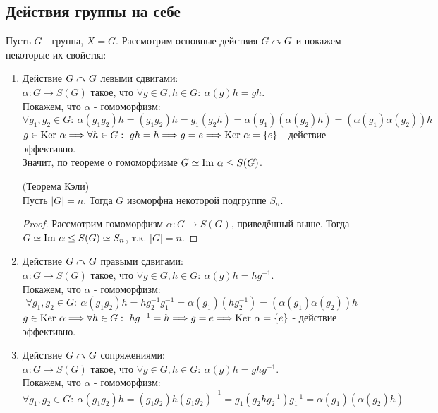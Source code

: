 \subsection{Действия группы на себе}
Пусть $G$ - группа, $X = G$. Рассмотрим основные действия $G \curvearrowright G$ и покажем некоторые их свойства:
\begin{enumerate}
    \item Действие $G \curvearrowright G$ левыми сдвигами:\\
    $\alpha: G \rightarrow S(G)$ такое, что $\forall g \in G, h \in G: \ \alpha(g)h = gh$.\\
    Покажем, что $\alpha$ - гомоморфизм:
    \[\forall g_1, g_2 \in G: \ \alpha(g_1g_2)h = (g_1g_2)h = g_1(g_2h) = \alpha(g_1)(\alpha(g_2)h) = (\alpha(g_1)\alpha(g_2))h\]
    $g \in \textup{Ker } \alpha \Longrightarrow \forall h \in G: \ gh = h \Longrightarrow g = e \Longrightarrow \textup{Ker }\alpha = \{e\}$ - действие эффективно.\\
    Значит, по теореме о гомоморфизме $G \simeq \textup{Im }\alpha \leq S(G)$.
    \begin{consequense} (Теорема Кэли)\\
        Пусть $|G| = n$. Тогда $G$ изоморфна некоторой подгруппе $S_n$.
    \end{consequense}
    \begin{proof}
        Рассмотрим гомоморфизм $\alpha: G \rightarrow S(G)$, приведённый выше. Тогда $G \simeq \textup{Im }\alpha \leq S(G) \simeq S_n$, т.к. $|G| = n$.
    \end{proof}
    \item Действие $G \curvearrowright G$ правыми сдвигами:\\
    $\alpha: G \rightarrow S(G)$ такое, что $\forall g \in G, h \in G: \ \alpha(g)h = hg^{-1}$.\\
    Покажем, что $\alpha$ - гомоморфизм:
    \[\forall g_1, g_2 \in G: \ \alpha(g_1g_2)h = hg_2^{-1}g_1^{-1} = \alpha(g_1)(hg_2^{-1}) = (\alpha(g_1)\alpha(g_2))h\]
    $g \in \textup{Ker } \alpha \Longrightarrow \forall h \in G: \ hg^{-1} = h \Longrightarrow g = e \Longrightarrow \textup{Ker }\alpha = \{e\}$ - действие эффективно.
    \item Действие $G \curvearrowright G$ сопряжениями:\\
    $\alpha: G \rightarrow S(G)$ такое, что $\forall g \in G, h \in G: \ \alpha(g)h = ghg^{-1}$.\\
    Покажем, что $\alpha$ - гомоморфизм:
    \[\forall g_1, g_2 \in G: \ \alpha(g_1g_2)h = (g_1g_2)h(g_1g_2)^{-1} = g_1(g_2hg_2^{-1})g_1^{-1} = \alpha(g_1)(\alpha(g_2)h)\]

\end{enumerate}
